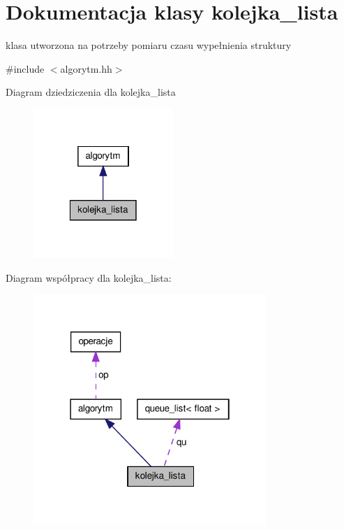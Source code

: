 \hypertarget{classkolejka__lista}{\section{\-Dokumentacja klasy kolejka\-\_\-lista}
\label{classkolejka__lista}
}


klasa utworzona na potrzeby pomiaru czasu wypełnienia struktury  




{\ttfamily \#include $<$algorytm.\-hh$>$}



\-Diagram dziedziczenia dla kolejka\-\_\-lista\nopagebreak
\begin{figure}[H]
\begin{center}
\leavevmode
\includegraphics[width=150pt]{classkolejka__lista__inherit__graph}
\end{center}
\end{figure}


\-Diagram współpracy dla kolejka\-\_\-lista\-:\nopagebreak
\begin{figure}[H]
\begin{center}
\leavevmode
\includegraphics[width=250pt]{classkolejka__lista__coll__graph}
\end{center}
\end{figure}
